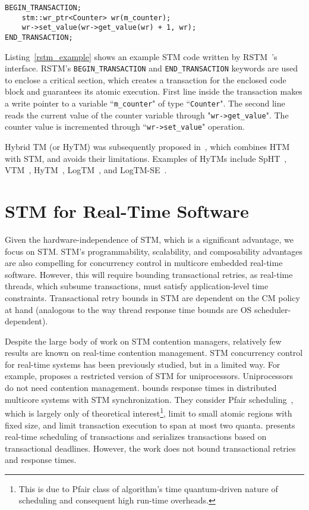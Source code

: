 \lstset{language=C++}
\begin{lstlisting}[caption={STM example},label=rstm_example]
BEGIN_TRANSACTION;
	stm::wr_ptr<Counter> wr(m_counter);
	wr->set_value(wr->get_value(wr) + 1, wr);
END_TRANSACTION;
\end{lstlisting}

Listing~\ref{rstm_example} shows an example STM code written by  RSTM~\cite{Shriraman:2007:IHA:1250662.1250676}'s interface. RSTM's \texttt{BEGIN\_TRANSACTION} and \texttt{END\_TRANSACTION} keywords are used to enclose a critical section, which creates a transaction for the enclosed code block and guarantees its atomic execution. First line inside the transaction makes a write pointer to a variable ``\lstinline!m_counter!" of type ``\lstinline!Counter!". The second line reads the current value of the counter variable through "\lstinline!wr->get_value!". The counter value is incremented through ``\lstinline!wr->set_value!" operation.

Hybrid TM (or HyTM) was subsequently proposed in~\cite{FirstHyTMlie2004hardware}, 
which combines HTM with STM, and avoids their limitations. Examples of HyTMs include SpHT~\cite{SpHTLev:2008:SHT:1345206.1345236}, VTM~\cite{VTM1431581}, HyTM~\cite{dam06},
LogTM~\cite{logTM1598134}, and LogTM-SE~\cite{logTMSE4147667}.



\section{STM for Real-Time Software}

Given the hardware-independence of STM, which is a significant advantage, we focus on STM. STM's programmability, scalability, and composability advantages are also compelling for concurrency control in multicore embedded real-time software. However, this will require bounding transactional  retries, as real-time threads, which subsume transactions, must satisfy application-level time constraints.  Transactional retry bounds in STM are dependent on the CM policy at hand (analogous to the way thread response time bounds are OS scheduler-dependent). 

Despite the large body of work on STM contention managers, relatively few results are known on real-time contention management. STM concurrency control for real-time systems has been previously studied, but in a limited way. For example, \cite{manson2006preemptible} proposes a restricted version of STM for uniprocessors. Uniprocessors do not need contention management. \cite{fahmy2009bounding} bounds response times in distributed multicore systems with STM synchronization. They consider Pfair scheduling~\cite{holman-thesis04}, which is largely only of theoretical interest\footnote{This is due to Pfair class of algorithm's time quantum-driven nature of scheduling and consequent high run-time overheads.}, limit to small atomic regions with fixed size, and limit transaction execution to span at most two quanta. \cite{sarni2009real} presents real-time scheduling of transactions and serializes transactions based on transactional deadlines. However, the work does not bound transactional retries and response times. 

